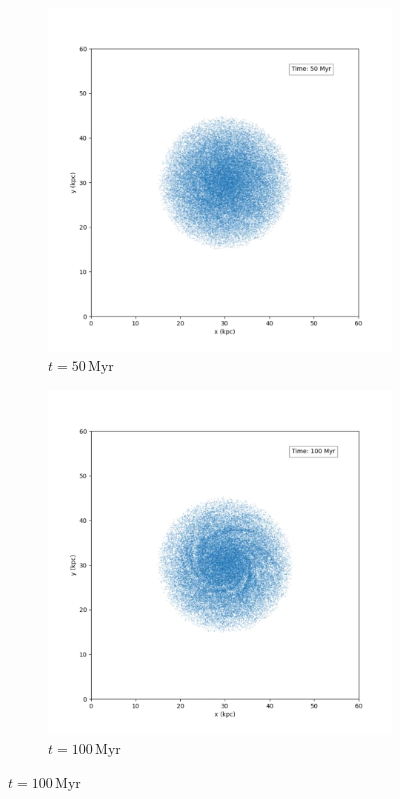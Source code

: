 \begin{figure}[H]
    \centering
    \begin{subfigure}[b]{0.45\textwidth}
        \centering
        \includegraphics[width=\textwidth]{chapters/results/img/p3m-galaxy/50myr.png}
        \caption{$t=50\,\text{Myr}$}
        \label{fig:spiral-galaxy-evolution-p3m-sub1}
    \end{subfigure}
    \hfill
    \begin{subfigure}[b]{0.45\textwidth}
        \centering
        \includegraphics[width=\textwidth]{chapters/results/img/p3m-galaxy/100myr.png}
        \caption{$t=100\,\text{Myr}$}
        \label{fig:spiral-galaxy-evolution-p3m-sub2}
    \end{subfigure}


\end{figure}
